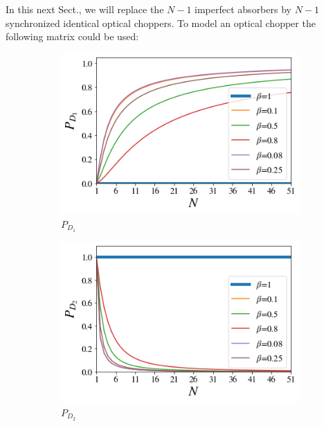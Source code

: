 \documentclass[12pt]{book}
\begin{document}
In this next Sect., we will replace the $N-1$ imperfect absorbers by $N-1$ synchronized identical optical choppers. To model an optical chopper the following matrix could be used:
 \begin{figure}[!t]
 
\centering
\begin{subfigure}[b]{0.45\linewidth}
\includegraphics[width=\linewidth]{images/ChopperD1.png}
\caption{$P_{D_{1}}$}
\label{fig:BS1}
\end{subfigure}
\begin{subfigure}[b]{0.45\linewidth}
\includegraphics[width=\linewidth]{images/ChopperD2.png}
\caption{$P_{D_{2}}$}
\label{fig:westminster_aerea}
\end{subfigure}
\begin{subfigure}[b]{0.45\linewidth}

\end{subfigure}
\end{figure}
\end{document}
